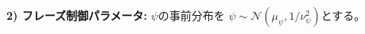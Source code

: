 \medskip
\noindent
{\bf 2) フレーズ制御パラメータ:}
$\psi$の事前分布を
$\psi\sim\mathcal{N}(\mu_{\psi},1/\nu_{\psi}^2)$とする。

